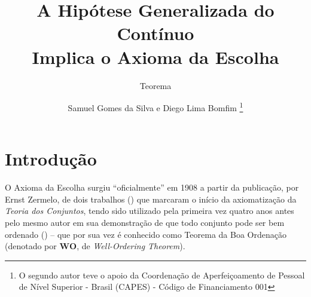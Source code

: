 \documentclass{hipatia}
\newcommand{\wo}{\mathbf{WO}}
\newcommand{\gch}{\mathbf{GCH}}
\newcommand{\ac}{\mathbf{AC}}
\begin{document}
\setcounter{page}{\teoremapage}
\subtitle{Teorema}
\title %
{\fontsize{26}{26}\selectfont A Hipótese Generalizada do Contínuo\\
\fontsize{26}{26}\selectfont Implica o Axioma da Escolha}
\author{Samuel Gomes da Silva e Diego Lima Bomfim
\footnote{O segundo autor teve o apoio da Coordenação de Aperfeiçoamento de Pessoal de Nível Superior - Brasil (CAPES) - Código de Financiamento 001}
}


\maketitle

\section{Introdução}

O Axioma da Escolha surgiu ``oficialmente'' em 1908 a partir
da publicação, por Ernst Zermelo, de dois trabalhos
(\cite{Zer1908,Zer1908a}) que marcaram o início da
axiomatização da {\it Teoria dos Conjuntos}, tendo sido
utilizado pela primeira vez quatro anos antes pelo mesmo
autor em sua demonstração de que todo conjunto pode ser bem
ordenado (\cite{Zer1904}) -- que por sua vez é conhecido como
Teorema da Boa Ordenação (denotado por $\wo$, de {\it
Well-Ordering Theorem}).
\end{document}
